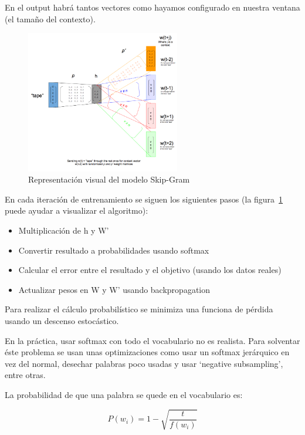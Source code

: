 \documentclass[withindex, glossary]{cam-thesis}
\begin{document}
En el output habrá tantos vectores como hayamos configurado en nuestra ventana (el tamaño del contexto).

\begin{figure}[!htbp]
    \centering
    \includegraphics[width=0.6\textwidth]{./figures/skip-gram-exp.png}
    \caption{Representación visual del modelo Skip-Gram\cite{skip-gram-exp}}\label{skip-gram-exp}
\end{figure}

En cada iteración de entrenamiento se siguen los siguientes pasos (la figura~\ref{skip-gram-exp} puede ayudar a visualizar el algoritmo):

\begin{itemize}
    \item Multiplicación de h y W'
    \item Convertir resultado a probabilidades usando \gls{softmax}
    \item Calcular el error entre el resultado y el objetivo (usando los datos reales)
    \item Actualizar pesos en W y W' usando backpropagation
\end{itemize}

Para realizar el cálculo probabilístico se minimiza una funciona de pérdida usando un descenso estocástico\cite{DBLP:journals/corr/Rong14}.

En la práctica, usar softmax con todo el vocabulario no es realista. Para solventar éste problema se usan unas optimizaciones como usar un softmax jerárquico en vez del normal, desechar palabras poco usadas y usar `negative subsampling', entre otras.

La probabilidad de que una palabra se quede en el vocabulario es:

\begin{equation}
    P(w_i) = 1 - \sqrt{\dfrac{t}{f(w_i)}}
\end{equation}
\end{document}
